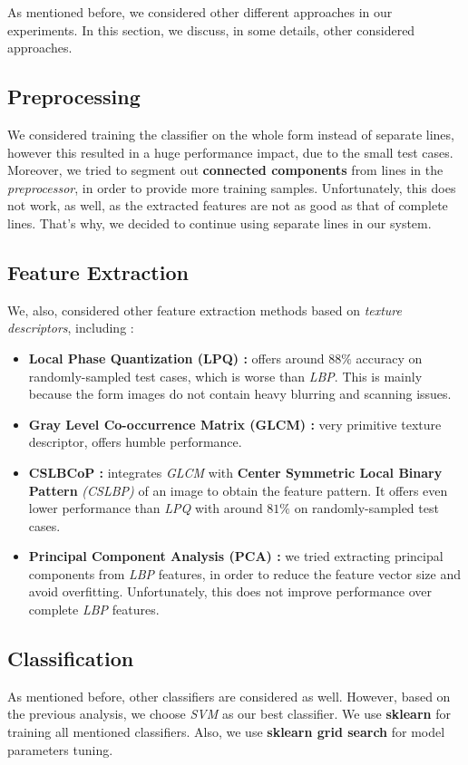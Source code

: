 As mentioned before, we considered other different approaches in our experiments. In this section, we discuss, in some details, other considered approaches.

\subsection{Preprocessing}
We considered training the classifier on the whole form instead of separate lines, however this resulted in a huge performance impact, due to the small test cases. Moreover, we tried to segment out \textbf{connected components} from lines in the \emph{preprocessor}, in order to provide more training samples. Unfortunately, this does not work, as well, as the extracted features are not as good as that of complete lines. That's why, we decided to continue using separate lines in our system.

\subsection{Feature Extraction}
We, also, considered other feature extraction methods based on \emph{texture descriptors}, including :
\begin{itemize}
    \item \textbf{Local Phase Quantization (LPQ) :} offers around $88\%$ accuracy on randomly-sampled test cases, which is worse than \emph{LBP}. This is mainly because the form images do not contain heavy blurring and scanning issues.
    \item \textbf{Gray Level Co-occurrence Matrix (GLCM) :} very primitive texture descriptor, offers humble performance.
    \item \textbf{CSLBCoP :} integrates \emph{GLCM} with \textbf{Center Symmetric Local Binary Pattern} \emph{(CSLBP)} of an image to obtain the feature pattern. It offers even lower performance than \emph{LPQ} with around $81\%$ on randomly-sampled test cases.
    \item \textbf{Principal Component Analysis (PCA) :} we tried extracting principal components from \emph{LBP} features, in order to reduce the feature vector size and avoid overfitting. Unfortunately, this does not improve performance over complete \emph{LBP} features.
\end{itemize}

\subsection{Classification}
As mentioned before, other classifiers are considered as well. However, based on the previous analysis, we choose \emph{SVM} as our best classifier. We use \textbf{sklearn} for training all mentioned classifiers. Also, we use \textbf{sklearn grid search} for model parameters tuning.
